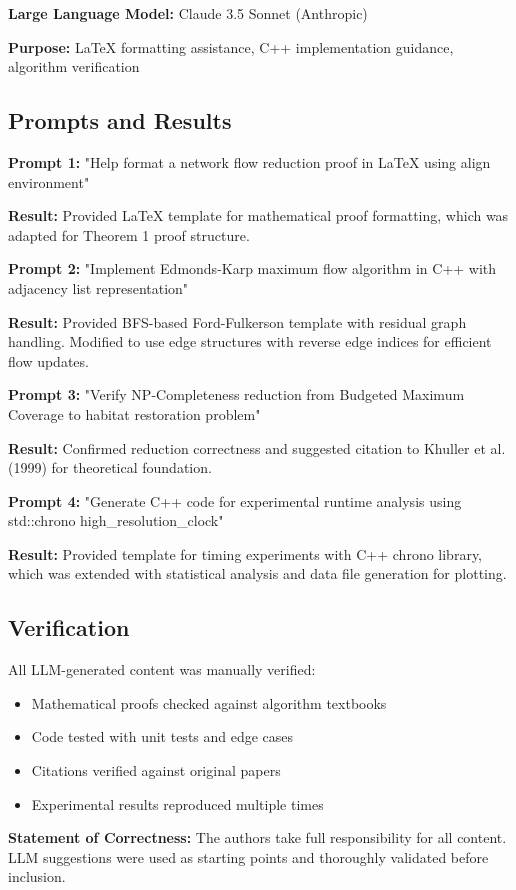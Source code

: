 \documentclass[sigconf,nonacm]{acmart}
\begin{document}
\textbf{Large Language Model:} Claude 3.5 Sonnet (Anthropic)

\textbf{Purpose:} LaTeX formatting assistance, C++ implementation guidance, algorithm verification

\subsection{Prompts and Results}

\textbf{Prompt 1:} "Help format a network flow reduction proof in LaTeX using align environment"

\textbf{Result:} Provided LaTeX template for mathematical proof formatting, which was adapted for Theorem 1 proof structure.

\textbf{Prompt 2:} "Implement Edmonds-Karp maximum flow algorithm in C++ with adjacency list representation"

\textbf{Result:} Provided BFS-based Ford-Fulkerson template with residual graph handling. Modified to use edge structures with reverse edge indices for efficient flow updates.

\textbf{Prompt 3:} "Verify NP-Completeness reduction from Budgeted Maximum Coverage to habitat restoration problem"

\textbf{Result:} Confirmed reduction correctness and suggested citation to Khuller et al. (1999) for theoretical foundation.

\textbf{Prompt 4:} "Generate C++ code for experimental runtime analysis using std::chrono high\_resolution\_clock"

\textbf{Result:} Provided template for timing experiments with C++ chrono library, which was extended with statistical analysis and data file generation for plotting.

\subsection{Verification}

All LLM-generated content was manually verified:
\begin{itemize}
    \item Mathematical proofs checked against algorithm textbooks
    \item Code tested with unit tests and edge cases
    \item Citations verified against original papers
    \item Experimental results reproduced multiple times
\end{itemize}

\textbf{Statement of Correctness:} The authors take full responsibility for all content. LLM suggestions were used as starting points and thoroughly validated before inclusion.
\end{document}
